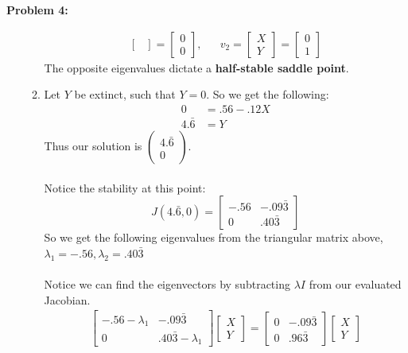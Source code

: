\documentclass[11pt]{article}
\newenvironment{problem}[1]{\textbf{Problem #1: }}{\newpage}
\begin{document}
\begin{problem}{4}
\begin{enumerate}[label = (\alph*)]
\begin{enumerate}[label = (\roman*)]
\begin{align*}
\begin{bmatrix}
				\end{bmatrix} = 
				\begin{bmatrix}
				0 \\ 0
				\end{bmatrix}, && v_2 = \begin{bmatrix}
				X \\ Y
				\end{bmatrix} = 
				\begin{bmatrix}
				0 \\ 1
				\end{bmatrix}
				\end{align*}
				The opposite eigenvalues dictate a \textbf{half-stable saddle point}.
				\newpage
				\item Let $Y$ be extinct, such that $Y = 0$.  So we get the following:
				\begin{align*}
				0 &= .56 - .12X \\
				4.\bar{6} &= Y
				\end{align*}
				Thus our solution is $\begin{pmatrix}
				4.\bar{6} \\ 0
				\end{pmatrix}$.
				\\ \\
				Notice the stability at this point:
				\[J(4.\bar{6},0) = \begin{bmatrix}
				-.56 & -.09\bar{3} \\ 0 & .40\bar{3}
				\end{bmatrix}\]
				So we get the following eigenvalues from the triangular matrix above, $\lambda_1 = -.56, \lambda_2 = .40\bar{3}$
				\\ \\
				Notice we can find the eigenvectors by subtracting $\lambda I$ from our evaluated Jacobian.
				\begin{align*}
				\begin{bmatrix}
				-.56 - \lambda_1 & -.09\bar{3} \\ 0 & .40\bar{3} -\lambda_1 
				\end{bmatrix}\begin{bmatrix}
				X \\ Y
				\end{bmatrix} = 
				\begin{bmatrix}
				0 & -.09\bar{3} \\ 0 & .96\bar{3}
				\end{bmatrix}\begin{bmatrix}
				X \\ Y

\end{bmatrix}
\end{align*}
\end{enumerate}
\end{enumerate}
\end{problem}
\end{document}
